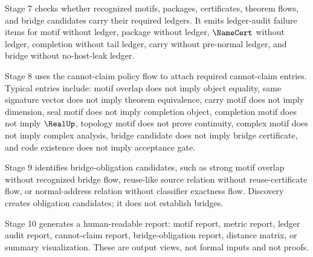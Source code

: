\begin{definition}
\label{def:analysis-pipeline-stage-ledger-audit}
Stage 7 checks whether recognized motifs, packages, certificates, theorem flows, and bridge candidates carry their required ledgers. It emits ledger-audit failure items for motif without ledger, package without ledger, $\NameCert$ without ledger, completion without tail ledger, carry without pre-normal ledger, and bridge without no-host-leak ledger.
\end{definition}

\begin{definition}
\label{def:analysis-pipeline-stage-cannot-claim-audit}
Stage 8 uses the cannot-claim policy flow to attach required cannot-claim entries. Typical entries include: motif overlap does not imply object equality, same signature vector does not imply theorem equivalence, carry motif does not imply dimension, seal motif does not imply completion object, completion motif does not imply $\RealUp$, topology motif does not prove continuity, complex motif does not imply complex analysis, bridge candidate does not imply bridge certificate, and code existence does not imply acceptance gate.
\end{definition}

\begin{definition}
\label{def:analysis-pipeline-stage-bridge-discovery}
Stage 9 identifies bridge-obligation candidates, such as strong motif overlap without recognized bridge flow, reuse-like source relation without reuse-certificate flow, or normal-address relation without classifier exactness flow. Discovery creates obligation candidates; it does not establish bridges.
\end{definition}

\begin{definition}
\label{def:analysis-pipeline-stage-report}
Stage 10 generates a human-readable report: motif report, metric report, ledger audit report, cannot-claim report, bridge-obligation report, distance matrix, or summary visualization. These are output views, not formal inputs and not proofs.
\end{definition}

